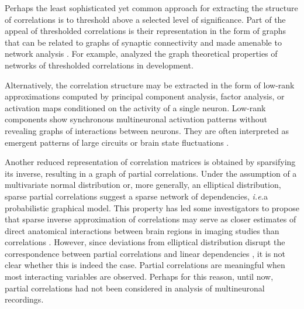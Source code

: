 \documentclass[10pt]{article}
\begin{document}
Perhaps the least sophisticated yet common approach for extracting the structure of correlations is to threshold above a selected level of significance. Part of the appeal of thresholded correlations is their representation in the form of graphs that can be related to graphs of synaptic connectivity and made amenable to network analysis \cite{Bullmore:2012}. For example, \cite{Malmersjo:2013} analyzed the graph theoretical properties of networks of thresholded correlations in development. 

Alternatively, the correlation structure may be extracted in the form of low-rank approximations computed by principal component analysis, factor analysis, or activation maps conditioned on the activity of a single neuron. Low-rank components show synchronous multineuronal activation patterns without revealing graphs of interactions between neurons. They are often interpreted as emergent patterns of large circuits or brain state fluctuations \cite{Kenet:2003}.

Another reduced representation of correlation matrices is obtained by sparsifying its inverse, resulting in a graph of partial correlations. Under the assumption of a multivariate normal distribution or, more generally, an elliptical distribution, sparse partial correlations suggest a sparse network of dependencies, \emph{i.e.}\;a probabilistic graphical model. This property has led some investigators to propose that sparse inverse approximation of correlations may serve as closer estimates of direct anatomical interactions between brain regions in imaging studies than correlations \cite{Varoquaux:2012,Ryali:2012}. However, since deviations from elliptical distribution disrupt the correspondence between partial correlations and linear dependencies \cite{Loh:2012}, it is not clear whether this is indeed  the case. Partial correlations are meaningful when most interacting variables are observed. Perhaps for this reason, until now, partial correlations had not been considered in analysis of multineuronal recordings.
\end{document}
